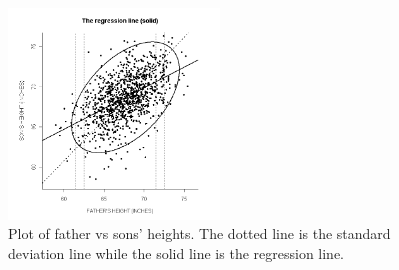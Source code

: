 \documentclass[12pt]{notes}
\begin{document}
\begin{figure}[H]
\centering
\includegraphics[width=0.5\textwidth]{figures/module1/heightScatter.png}
\caption{Plot of father vs sons' heights. The dotted line is the standard deviation line while the solid line is the regression line.}
\end{figure}
\end{document}
